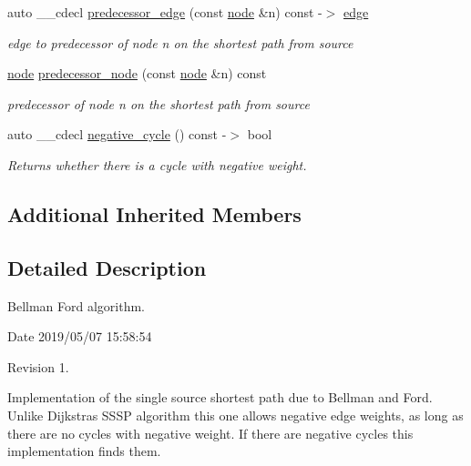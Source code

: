 \begin{DoxyCompactItemize}
auto \+\_\+\+\_\+cdecl \mbox{\hyperlink{classbellman__ford_a367c6fa92aaf08ddbc4c9545eabf6518}{predecessor\+\_\+edge}} (const \mbox{\hyperlink{classnode}{node}} \&n) const -\/$>$ \mbox{\hyperlink{classedge}{edge}}
\begin{DoxyCompactList}\small\item\em edge to predecessor of node {\itshape n} on the shortest path from source \end{DoxyCompactList}\item 
\mbox{\hyperlink{classnode}{node}} \mbox{\hyperlink{classbellman__ford_a403e286ec8cbe3c30a7a729c5041155e}{predecessor\+\_\+node}} (const \mbox{\hyperlink{classnode}{node}} \&n) const
\begin{DoxyCompactList}\small\item\em predecessor of node {\itshape n} on the shortest path from source \end{DoxyCompactList}\item 
\mbox{\label{classbellman__ford_ac3767c2dd5c156742b2bba63546543a1}} 
auto \+\_\+\+\_\+cdecl \mbox{\hyperlink{classbellman__ford_ac3767c2dd5c156742b2bba63546543a1}{negative\+\_\+cycle}} () const -\/$>$ bool
\begin{DoxyCompactList}\small\item\em Returns whether there is a cycle with negative weight. \end{DoxyCompactList}\end{DoxyCompactItemize}
\subsection*{Additional Inherited Members}


\subsection{Detailed Description}
Bellman Ford algorithm. 

\begin{DoxyParagraph}{Date}
2019/05/07 15\+:58\+:54 
\end{DoxyParagraph}
\begin{DoxyParagraph}{Revision}
1. 
\end{DoxyParagraph}


Implementation of the single source shortest path due to Bellman and Ford. Unlike Dijkstra\textquotesingle{}s S\+S\+SP algorithm this one allows negative edge weights, as long as there are no cycles with negative weight. If there are negative cycles this implementation finds them. 

